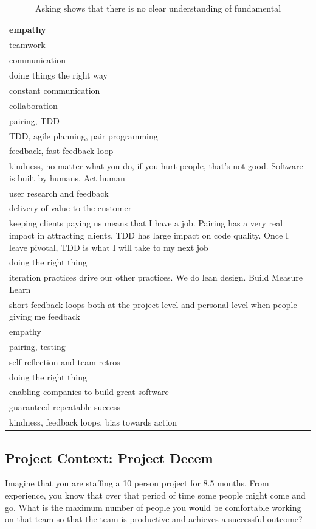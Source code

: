 \begin{table}[t]
\renewcommand{\arraystretch}{1.3}
\centering
\caption{Asking  shows that there is no clear understanding of fundamental}
\label{CorePractice}
\begin{tabular}{|p{3.10in}|}
\hline
empathy \\ \hline
teamwork \\ \hline
communication \\ \hline
doing things the right way \\ \hline
constant communication \\ \hline
collaboration \\ \hline
pairing, TDD \\ \hline
TDD, agile planning, pair programming \\ \hline
feedback, fast feedback loop \\ \hline
kindness, no matter what you do, if you hurt people, that's not good. Software is built by humans. Act human \\ \hline
user research and feedback \\ \hline
delivery of value to the customer \\ \hline
keeping clients paying us means that I have a job. Pairing has a very real impact in attracting clients. TDD has large impact on code quality. Once I leave pivotal, TDD is what I will take to my next job \\ \hline
doing the right thing \\ \hline
iteration practices drive our other practices. We do lean design. Build Measure Learn \\ \hline
short feedback loops both at the project level and personal level when people giving me feedback \\ \hline
empathy \\ \hline
pairing, testing \\ \hline
self reflection and  team retros \\ \hline
doing the right thing \\ \hline
enabling companies to build great software \\ \hline
guaranteed repeatable success \\ \hline
kindness, feedback loops, bias towards action \\
\hline
\end{tabular}
\end{table}

\subsection{Project Context: Project Decem}
\label{ExampleInAction}
Imagine that you are staffing a 10 person project for 8.5 months. From experience, you know that over that period of time some people might come and go. What is the maximum number of people you would be comfortable working on that team so that the team is productive and achieves a successful outcome?  

